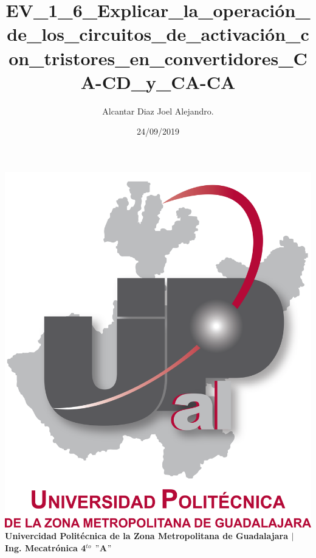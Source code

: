 \documentclass[letterpaper]{article}
\title{EV\_1\_6\_Explicar\_la\_operación\_de\_los\_circuitos\_de\_activación\_con\_tristores\_en\_convertidores\_CA-CD\_y\_CA-CA}
\author{Alcantar Diaz Joel Alejandro.}
\date{24/09/2019}
\begin{document}
    \maketitle
    \begin{center}
        \includegraphics[scale=0.5]{IMG/UPZMGlog.png}\\
        \vspace{2cm}
    \textbf{Univercidad Politécnica de la Zona Metropolitana de Guadalajara $|$ Ing. Mecatrónica 4$^{to}$ $"$A$"$}
    \end{center}
    \newpage
\end{document}
